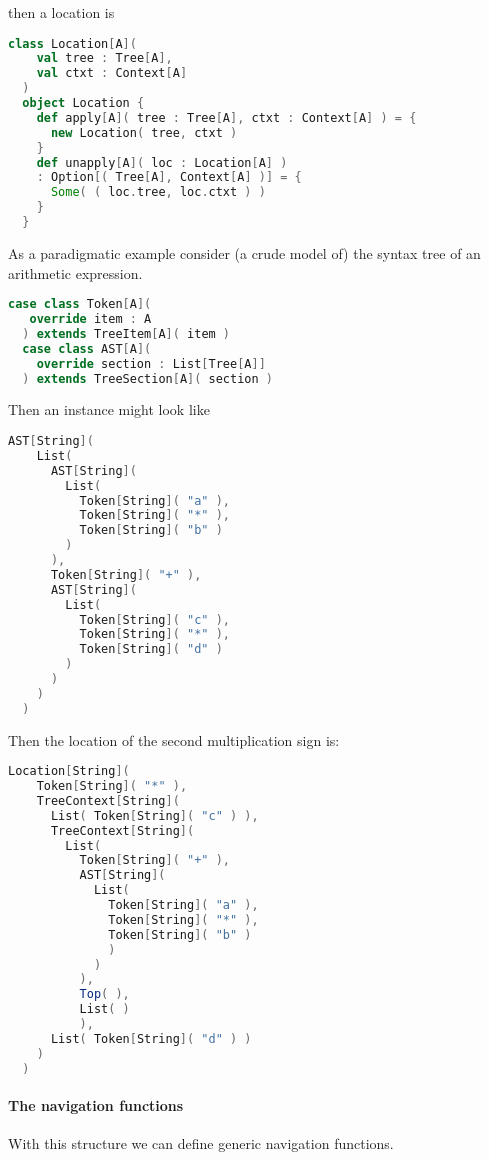 then a location is

\begin{lstlisting}[language=Scala,mathescape=true]
  class Location[A](
    val tree : Tree[A],
    val ctxt : Context[A]
  )
  object Location {
    def apply[A]( tree : Tree[A], ctxt : Context[A] ) = {
      new Location( tree, ctxt )
    }
    def unapply[A]( loc : Location[A] )
    : Option[( Tree[A], Context[A] )] = {
      Some( ( loc.tree, loc.ctxt ) )
    }
  }  
\end{lstlisting}

As a paradigmatic example consider (a crude model of) the syntax tree
of an arithmetic expression.

\begin{lstlisting}[language=Scala,mathescape=true]
  case class Token[A](
   override item : A
  ) extends TreeItem[A]( item )
  case class AST[A](
    override section : List[Tree[A]]
  ) extends TreeSection[A]( section )
\end{lstlisting}

Then an instance might look like

\break

\begin{lstlisting}[language=Scala,mathescape=true]
  AST[String](
    List(
      AST[String](
        List(
          Token[String]( "a" ),
          Token[String]( "*" ),
          Token[String]( "b" )
        )
      ),
      Token[String]( "+" ),
      AST[String](
        List(
          Token[String]( "c" ),
          Token[String]( "*" ),
          Token[String]( "d" )
        )
      )
    )
  )
\end{lstlisting}

Then the location of the second multiplication sign is:

\begin{lstlisting}[language=Scala,mathescape=true]
  Location[String](
    Token[String]( "*" ),
    TreeContext[String](
      List( Token[String]( "c" ) ),
      TreeContext[String](
        List(
          Token[String]( "+" ),
          AST[String](
            List(
              Token[String]( "a" ),
              Token[String]( "*" ),
              Token[String]( "b" )
              )
            )
          ),
          Top( ),
          List( )
          ),
      List( Token[String]( "d" ) )
    )
  )
\end{lstlisting}

\paragraph{The navigation functions} With this structure we can define
generic navigation functions.

